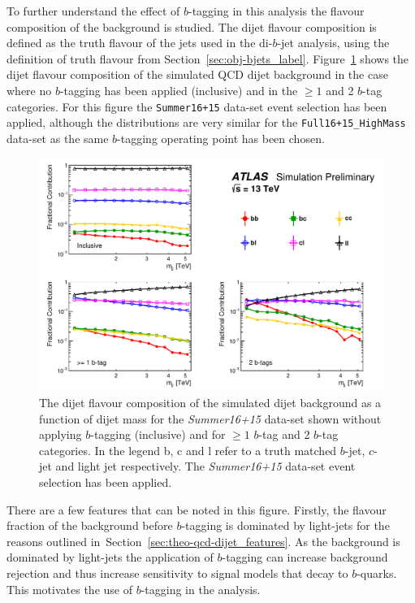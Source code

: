 To further understand the effect of $b$-tagging in this analysis the flavour composition of the background is studied.
The dijet flavour composition is defined as the truth flavour of the jets used in the di-$b$-jet analysis,
using the definition of truth flavour from Section~\ref{sec:obj-bjets_label}.
Figure~\ref{fig:evt-summer_flavcomp} shows the dijet flavour composition of the simulated QCD dijet background in
the case where no $b$-tagging has been applied (inclusive) and in the $\geq1$ and 2 $b$-tag categories.
For this figure the \verb|Summer16+15| data-set event selection has been applied,
although the distributions are very similar for the \verb|Full16+15_HighMass| data-set
as the same $b$-tagging operating point has been chosen.

\begin{figure}[!ht]
  \begin{center}
    \includegraphics[width=0.99\linewidth, angle=0]{figs/Dibjet/ICHEP/evt-summer_flavcomp.pdf}
  \end{center}
  \caption{The dijet flavour composition of the simulated dijet background as a function of dijet mass for the \textit{Summer16+15} data-set
    shown without applying $b$-tagging (inclusive) and for $\geq1$ $b$-tag and 2 $b$-tag categories.
    In the legend b, c and l refer to a truth matched $b$-jet, $c$-jet and light jet respectively.
    The \textit{Summer16+15} data-set event selection has been applied.}
  \label{fig:evt-summer_flavcomp}
\end{figure}

There are a few features that can be noted in this figure.
Firstly, the flavour fraction of the background before $b$-tagging is dominated by light-jets
for the reasons outlined in~Section~\ref{sec:theo-qcd-dijet_features}.
As the background is dominated by light-jets the application
of $b$-tagging can increase background rejection
and thus increase sensitivity to signal models that decay to $b$-quarks.
This motivates the use of $b$-tagging in the analysis.

